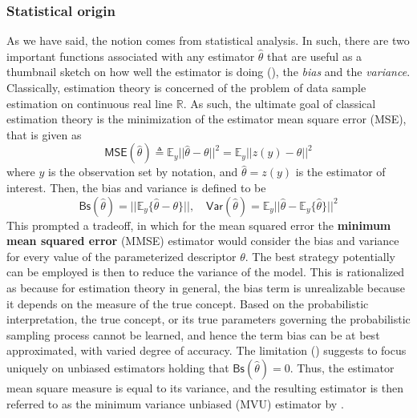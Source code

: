 \subsubsection{Statistical origin}
As we have said, the notion comes from statistical analysis. In such, there are two important functions associated with any estimator $\hat{\theta}$ that are useful as a thumbnail sketch on how well the estimator is doing (\cite{liam_statistics_2005}), the \textit{bias} and the \textit{variance}. Classically, estimation theory is concerned of the problem of data sample estimation on continuous real line $\mathbb{R}$. As such, the ultimate goal of classical estimation theory is the minimization of the estimator mean square error (MSE), that is given as 
\begin{equation}
  \mathsf{MSE}(\hat{\theta}) \triangleq \mathbb{E}_{y} \lvert \lvert \hat{\theta} - \theta \rvert \rvert^{2} = \mathbb{E}_{y} \lvert\lvert z(y) - \theta \rvert \rvert^{2}
\end{equation}
where $y$ is the observation set by notation, and $\hat{\theta}=z(y)$ is the estimator of interest. Then, the bias and variance is defined to be
\begin{equation}
  \mathsf{Bs}(\hat{\theta}) = \lvert\lvert \mathbb{E}_{y} \{\hat{\theta} - \theta\}\rvert\rvert, \quad \mathsf{Var}(\hat{\theta}) = \mathbb{E}_{y} \lvert\lvert \hat{\theta} - \mathbb{E}_{y} \{\hat{\theta}\}\vert\rvert^{2}
\end{equation}
This prompted a tradeoff, in which for the mean squared error the \textbf{minimum mean squared error} (MMSE) estimator would consider the bias and variance for every value of the parameterized descriptor $\theta$. The best strategy potentially can be employed is then to reduce the variance of the model. This is rationalized as because for estimation theory in general, the bias term is unrealizable because it depends on the measure of the true concept. Based on the probabilistic interpretation, the true concept, or its true parameters governing the probabilistic sampling process cannot be learned, and hence the term bias can be at best approximated, with varied degree of accuracy. The limitation (\cite{piera_sample_2005,MkayPretenceSignalStatistics1993}) suggests to focus uniquely on unbiased estimators holding that $\mathsf{Bs}(\hat{\theta})=0$. Thus, the estimator mean square measure is equal to its variance, and the resulting estimator is then referred to as the minimum variance unbiased (MVU) estimator by \cite{MkayPretenceSignalStatistics1993}. 

